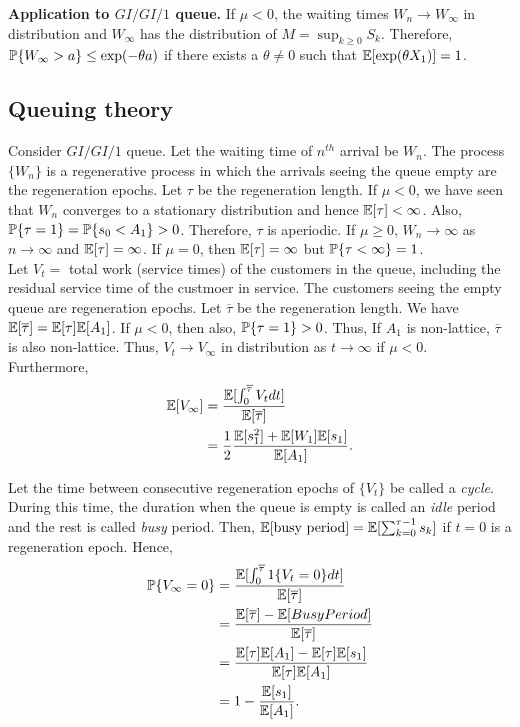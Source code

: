 \documentclass[all-lectures.tex]{subfiles}
\begin{document}
\indent \textbf{Application to $GI/GI/1$ queue.} If $\mu < 0$, the waiting times $W_n \to W_\infty$ in distribution and $W_\infty$ has the distribution of $M = \sup_{k \geq 0}S_k$. Therefore, $\P\{W_\infty > a\} \leq \exp(-\theta a)$ if there exists a $\theta \neq 0$ such that $\E[\exp(\theta X_1)] = 1$.
\subsection{Queuing theory}
Consider $GI/GI/1$ queue. Let the waiting time of $n^{th}$ arrival be $W_n$. The process $\{W_n\}$ is a regenerative process in which the arrivals seeing the queue empty are the regeneration epochs. Let $\tau$ be the regeneration length. If $\mu<0$, we have seen that  $W_n$ converges to a stationary distribution and hence $\E[\tau]<\infty$. Also, $\P\{\tau = 1\} = \P\{s_0 < A_1\} >0$. Therefore, $\tau$ is aperiodic. If $\mu\geq 0$, $W_n \to \infty$ as $n \to \infty$ and $\E[\tau] = \infty$.  If $\mu =0$, then $\E[\tau]= \infty$ but $\P\{\tau < \infty\} =1$.\\
\indent Let $V_t=$ total work (service times) of the customers in the queue, including the residual service time of the custmoer in service. The customers seeing the empty queue are regeneration epochs. Let $\overline{\tau}$ be the regeneration length. We have $\E[\overline{\tau}] = \E[\tau]\E[A_1]$. If $\mu < 0$, then also, $\P\{\tau =1\}>0$. Thus, If $A_1$ is non-lattice, $\overline{\tau}$ is also non-lattice. Thus, $V_t \to V_\infty$ in distribution as $t \to \infty$ if $\mu <0$.\\
\indent Furthermore, %
\begin{align*}
\E[V_\infty] &= \frac{\E[\int_0^{\overline{\tau}} V_t dt]}{\E[\overline{\tau}]} \\
&= \frac{1}{2} \frac{\E[s_1^2] + \E[W_1]\E[s_1]}{\E[A_1]}.
\end{align*}


Let the time between consecutive regeneration epochs of $\{V_t\}$ be called a \textit{cycle}. During this time, the duration when the queue is empty is called an \textit{idle }period and the rest is called \textit{busy} period. Then, $\E[\text{busy period}] = \E[\sum_{k=0}^{\tau -1} s_k]$ if $t=0$ is a regeneration epoch. Hence, 
\begin{align*}
\P\{V_\infty = 0\}  &= \frac{ \E[\int_0^{\overline{\tau}} 1\{V_t=0\}dt]}{\E[\overline{\tau}]} \\
&= \frac{\E[\overline{\tau}]-\E[Busy Period]}{\E[\overline{\tau}]} \\
&= \frac{\E[{\tau}]\E[A_1]-\E[\tau]\E[s_1]}{\E[{\tau}]\E[A_1]} \\
&= 1-\frac{\E[s_1]}{\E[A_1]}.
\end{align*}
\end{document}
